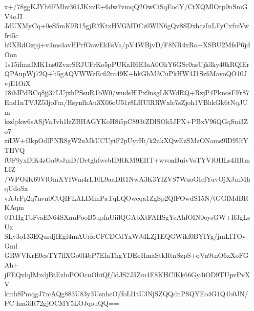 x+/78ggKJYh6FMbv361JKxzE+6dw7vmqQ2OwCiSqEodY/CtXQMlOtp0nSmGV4oJI
JdUXMyCq+0eS5mK9R15gjR7KtxHVGMDCz0WlN6gQv8SDxhczInLFyCxfmVwfrt5c
h9XRdOzpj+v4ms4avHPrfOawEkFsVa/pV4WBjvD/F8NR4xRo+XSBU2MfsP6jdOon
1s15ifmnIMK1ns0ZvzrSRJUFrKo5pPUKaH6E3aA0OkY6GSc0asUjk3ky40kRQlEr
QPAupWj72Q+h5gAQVWWzEc62ra49K+hkGhM3CuPkHW4J1Sz6MavoQO10JvjE1OiX
78ihIPdRCq8jj37LUjxhPSsuR1bW0/wudsHlPx9nsgLKWdRQ+RzjP4PknosFFr87
End1nTVJZ53joFm/HsynlhAu3X06oU51r8LHUlRRWxlc7sZjoh1VBhkGk6tNqJUm
kzdpkw6sASjVaJvh1lzZBHAGYKoH8i5pC893tZDlSOk5JPX+PBxV96QGqSni3Zo7
ziLW+f3kpOdlPNR8gW2uMkUCUyiF2pUyrHi/k2nkXQwEzSMzONams9lD9UfYTHVQ
fUF9yxDiK4zGa9bJmD/DetghfwcbIDRKM9EHT+wvonBuivVsTYVlOHLs4IIRmLIZ
/WPO4K69VlOmXYIWm4rL10L9aaDR1NwA3K3YlZVS7WuoGIefYuvOjXJmMhqUdoSx
vAJrFp2q7nvn0CtQIFLALIMmPaTqLQOwcqa1ZgSp2QfFOwdS15N/tGGfMdBRKAqm
0TtHgTbFvaEN64SXnuPooB5upfnUiilQGAbXtFAHSgYcAhfOIN0oysGW+R3gLsUx
SLy3o133EQurdjIEgf4mAUrfoCFCDCdYxWJdLZj1EQGWikf0BYIYg/jmLITOvGmI
GRWVKrE0esTY7flXGo0l4bP7ElnThgYDEqHmaStkRtnSzpS+qVu9tnO6xXoFGAh+
jFEQvlqIMxdjBtEzluPOOcuObiQf/ldJS7J5Zm4E8KHClKk66Gy4iOD9TUpvPvXV
kmh8PmqgJ7rcAQg883U83y3UsnhcO/foLl1tU3NjSZQQdnPSQYEo4G1Q4b0JN/PC
hm3fR72gjOCMY5LOJqouQQ==
